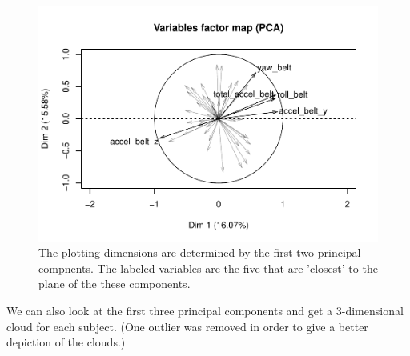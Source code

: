 \documentclass[12pt,twoside]{reedthesis}
\begin{document}
  \begin{figure}
  
  {\centering \includegraphics{A_Random_Forest_Model_for_Computer-Assisted_Activity-Recognition_files/figure-latex/unnamed-chunk-51-1} 
  
  }
  
  \caption[The plotting dimensions are determined by the first two principal compnents]{The plotting dimensions are determined by the first two principal compnents.  The labeled variables are the five that are 'closest' to the plane of the these components.}\label{fig:unnamed-chunk-51}
  \end{figure}
  
  \begin{Shaded}
  \begin{Highlighting}[]
  \end{Highlighting}
  \end{Shaded}
  
  \newpage
  
  We can also look at the first three principal components and get a
  3-dimensional cloud for each subject. (One outlier was removed in order
  to give a better depiction of the clouds.)
  
\end{document}
